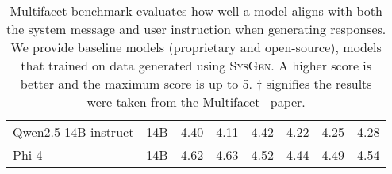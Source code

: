 \begin{table*}[t]
{{\begin{tabular}{lccccccc}
Qwen2.5-14B-instruct & 14B & 4.40 & 4.11 & 4.42 & 4.22 & 4.25 & 4.28\\ 
Phi-4 & 14B & 4.62 & 4.63 & 4.52 & 4.44 & 4.49 & 4.54 \\ 
\bottomrule
\end{tabular}}}
\caption{Multifacet benchmark evaluates how well a model aligns with both the system message and user instruction when generating responses. We provide baseline models (proprietary and open-source), models that trained on data generated using \textsc{SysGen}. A higher score is better and the maximum score is up to 5. $\dagger$ signifies the results were taken from the Multifacet~\citep{lee2024aligning} paper.}
\label{tab:main_experiments}
\end{table*}